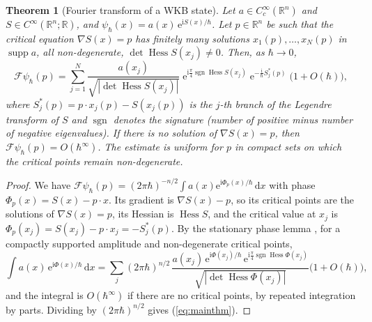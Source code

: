 \documentclass[11pt,a4paper]{article}
\newcommand{\R}{\mathbb{R}}
\newcommand{\ii}{\mathrm{i}}
\newcommand{\dd}{\mathrm{d}}
\newcommand{\ee}{\mathrm{e}}
\newcommand{\hb}{\hbar}
\newcommand{\sgn}{\operatorname{sgn}}
\newcommand{\Hess}{\operatorname{Hess}}
\newcommand{\FT}{\mathcal{F}}
\theoremstyle{plain}
\newtheorem{theorem}{Theorem}[section]
\theoremstyle{definition}
\theoremstyle{remark}
\begin{document}
\begin{theorem}[Fourier transform of a WKB state]\label{thm:main}
Let $a\in C_c^\infty(\R^n)$ and $S\in C^\infty(\R^n;\R)$, and $\psi_\hb(x)=a(x)\,\ee^{\ii S(x)/\hb}$. Let $p\in\R^n$ be such that the critical equation $\nabla S(x)=p$ has finitely many solutions $x_1(p),\dots,x_N(p)$ in $\operatorname{supp}a$, all non-degenerate, $\det\Hess S(x_j)\neq0$. Then, as $\hb\to0$,
\begin{equation}\label{eq:mainthm}
\FT\psi_\hb(p)=\sum_{j=1}^N\frac{a(x_j)}{\sqrt{|\det\Hess S(x_j)|}}\;\ee^{\ii\frac{\pi}{4}\sgn\Hess S(x_j)}\;\ee^{-\frac{\ii}{\hb}S_j^*(p)}\;\bigl(1+O(\hb)\bigr),
\end{equation}
where $S_j^*(p)=p\cdot x_j(p)-S(x_j(p))$ is the $j$-th branch of the Legendre transform of $S$ and $\sgn$ denotes the signature (number of positive minus number of negative eigenvalues). If there is no solution of $\nabla S(x)=p$, then $\FT\psi_\hb(p)=O(\hb^\infty)$. The estimate is uniform for $p$ in compact sets on which the critical points remain non-degenerate.
\end{theorem}

\begin{proof}
We have $\FT\psi_\hb(p)=(2\pi\hb)^{-n/2}\int a(x)\ee^{\ii\Phi_p(x)/\hb}\,\dd x$ with phase $\Phi_p(x)=S(x)-p\cdot x$. Its gradient is $\nabla S(x)-p$, so its critical points are the solutions of $\nabla S(x)=p$, its Hessian is $\Hess S$, and the critical value at $x_j$ is $\Phi_p(x_j)=S(x_j)-p\cdot x_j=-S^*_j(p)$. By the stationary phase lemma \cite{Hormander1,Stein,Wong}, for a compactly supported amplitude and non-degenerate critical points,
\begin{equation}
\int a(x)\,\ee^{\ii\Phi(x)/\hb}\,\dd x=\sum_j(2\pi\hb)^{n/2}\,\frac{a(x_j)\,\ee^{\ii\Phi(x_j)/\hb}\,\ee^{\ii\frac\pi4\sgn\Hess\Phi(x_j)}}{\sqrt{|\det\Hess\Phi(x_j)|}}\bigl(1+O(\hb)\bigr),
\end{equation}
and the integral is $O(\hb^\infty)$ if there are no critical points, by repeated integration by parts. Dividing by $(2\pi\hb)^{n/2}$ gives (\ref{eq:mainthm}).
\end{proof}
\end{document}
